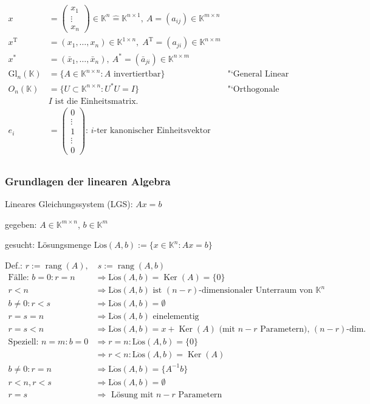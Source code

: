 \documentclass[11pt]{scrartcl}
\newcommand*{\T}{\mathrm T}
\newcommand*{\Gl}{\mathrm{Gl}}
\newcommand*{\Loes}{\mathrm{L\ddot{o}s}}
\DeclareMathOperator*{\rang}{\mathrm{rang}}
\DeclareMathOperator*{\Ker}{\mathrm{Ker}}
\theoremstyle{break}
\theoremstyle{remark}
\begin{document}
\begin{align*}
x &= \begin{pmatrix} x_1 \\ \vdots \\ x_n \end{pmatrix} 
\in \mathbb{K}^n \widehat{=} \mathbb{K}^{n \times 1},  
~ A=(a_{ij}) \in \mathbb{K}^{m \times n}  \\
x^\T &= (x_1, \dots, x_n) \in \mathbb{K}^{1 \times n},\;
A^\T = (a_{ji}) \in \mathbb{K}^{n \times m}  \\ 
x^{\ast} &= (\bar{x}_1, \dots, \bar{x}_n), 
~A^{\ast} = (\bar{a}_{ji}) \in \mathbb{K}^{n \times m}  \\
\Gl_n(\mathbb K) &= \{A \in \mathbb{K}^{n \times n}: A 
\text{ invertiertbar} \} & \text{"`General Linear Group"'}  \\
O_n (\mathbb{K})&= \{ U \subset \mathbb{K}^{n \times n}: 
U^{\ast} U = I \} & \text{"`Orthogonale Gruppe"'} \\
& I \text{ ist die Einheitsmatrix.} \\
e_i &= \begin{pmatrix} 0 \\ \vdots \\ 1 \\ \vdots \\ 0 \end{pmatrix} 
\text{:  $i$-ter kanonischer Einheitsvektor } \\
\end{align*}

\subsubsection{Grundlagen der linearen Algebra}

Lineares Gleichungssystem (LGS): $Ax=b$

gegeben: $A \in \mathbb{K}^{m \times n}$, $b \in \mathbb{K}^m$

gesucht: Lösungsmenge $\Loes(A,b) := \{x \in \mathbb{K}^n : Ax=b\} $


Def.: $r := \rang(A),\quad s := \rang(A,b)$
\begin{align*}
\text{Fälle: } b =0 : r = n &\Rightarrow \Loes(A,b)=\Ker(A)=\{0\}\\
r<n &\Rightarrow \Loes(A,b) \text{ ist $(n-r)$-dimensionaler Unterraum 
von } \mathbb{K}^n \\
b \neq 0: r<s &\Rightarrow \Loes(A,b) = \emptyset \\
r=s=n &\Rightarrow \Loes(A,b) \text{ einelementig }\\
r=s<n &\Rightarrow \Loes(A,b) = x + \Ker(A)
\text{ (mit $n-r$ Parametern), $(n-r)$-dim. } \\
\text{Speziell: } n=m: b=0 &\Rightarrow r=n: \Loes(A,b) = \{0\}\\
&\Rightarrow r<n: \Loes(A,b) = \Ker(A)\\
b \neq 0: r=n &\Rightarrow \Loes(A,b) = \{A^{-1}b\}\\ 
	r<n, r<s &\Rightarrow \Loes(A,b) = \emptyset \\
	 r=s &\Rightarrow \text{ Lösung mit $n-r$ Parametern } \\
\end{align*} 
\end{document}
